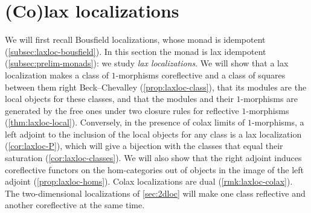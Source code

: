 \section{(Co)lax localizations}
\label{sec:laxloc}

%
We will first recall Bousfield localizations, whose monad is idempotent
(\cref{subsec:laxloc-bousfield}). In this section the monad is lax idempotent
(\cref{subsec:prelim-monads}): we study \emph{lax localizations}. We will show
that a lax localization makes a class of $1$-morphisms coreflective and a class
of squares between them right Beck--Chevalley (\cref{prop:laxloc-class}), that
its modules are the local objects for these classes, and that the modules and
their $1$-morphisms are generated by the free ones under two closure rules for
reflective $1$-morphisms (\cref{thm:laxloc-local}). Conversely,
in the presence of
colax limits of $1$-morphisms, a left adjoint to the inclusion of the local
objects for any class is a lax localization (\cref{cor:laxloc-P}), which will
give a bijection with the classes that equal their saturation
(\cref{cor:laxloc-classes}). We will also show that the right adjoint induces
coreflective functors on the hom-categories out of objects in the image of the
left adjoint (\cref{prop:laxloc-homs}).
Colax localizations are dual (\cref{rmk:laxloc-colax}). The two-dimensional
localizations of \cref{sec:2dloc} will make one class reflective and another
coreflective at the same time.







